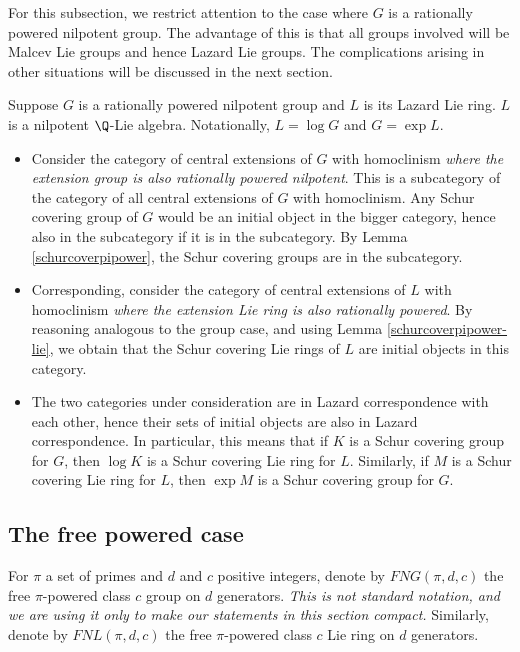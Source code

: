 For this subsection, we restrict attention to the case where $G$ is a
rationally powered nilpotent group. The advantage of this is that all
groups involved will be Malcev Lie groups and hence Lazard Lie
groups. The complications arising in other situations will be
discussed in the next section.

Suppose $G$ is a rationally powered nilpotent group and $L$ is its
Lazard Lie ring. $L$ is a nilpotent $\Q$-Lie algebra. Notationally, $L
= \log G$ and $G = \exp L$.

\begin{itemize}
\item Consider the category of central extensions of $G$ with
  homoclinism {\em where the extension group is also rationally
    powered nilpotent}. This is a subcategory of the category of all
  central extensions of $G$ with homoclinism. Any Schur covering group
  of $G$ would be an initial object in the bigger category, hence also
  in the subcategory if it is in the subcategory. By Lemma
  \ref{schurcoverpipower}, the Schur covering groups are in the
  subcategory.
\item Corresponding, consider the category of central extensions of
  $L$ with homoclinism {\em where the extension Lie ring is also
  rationally powered}. By reasoning analogous to the group case, and
  using Lemma \ref{schurcoverpipower-lie}, we obtain that the Schur
  covering Lie rings of $L$ are initial objects in this category.
\item The two categories under consideration are in Lazard
  correspondence with each other, hence their sets of initial objects
  are also in Lazard correspondence. In particular, this means that if
  $K$ is a Schur covering group for $G$, then $\log K$ is a Schur
  covering Lie ring for $L$. Similarly, if $M$ is a Schur covering Lie
  ring for $L$, then $\exp M$ is a Schur covering group for $G$.
\end{itemize}

\subsection{The free powered case}

For $\pi$ a set of primes and $d$ and $c$ positive integers, denote by
$FNG(\pi,d,c)$ the free $\pi$-powered class $c$ group on $d$
generators. {\em This is not standard notation, and we are using it
  only to make our statements in this section compact.} Similarly,
denote by $FNL(\pi,d,c)$ the free $\pi$-powered class $c$ Lie ring on
$d$ generators.

